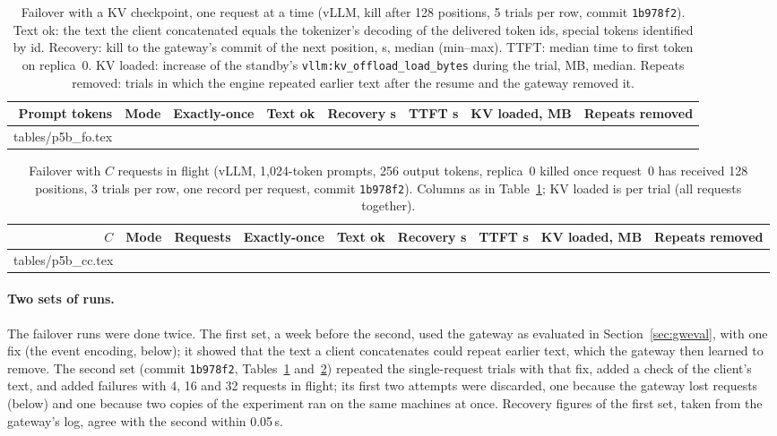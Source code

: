 \documentclass[10pt,twocolumn]{article}
\makeatletter
\def\PfbFoRows{\@@input tables/p5b_fo.tex }
\def\PccRows{\@@input tables/p5b_cc.tex }
\makeatother
\begin{document}
\begin{table}[t]
\centering\small
\caption{Failover with a KV checkpoint, one request at a time (vLLM, kill
after 128 positions, 5 trials per row, commit \texttt{1b978f2}). Text ok: the
text the client concatenated equals the tokenizer's decoding of the delivered
token ids, special tokens identified by id. Recovery: kill to the gateway's
commit of the next position, s, median (min--max). TTFT: median time to first
token on replica~0. KV loaded: increase of the standby's
\texttt{vllm:kv\_offload\_load\_bytes} during the trial, MB, median. Repeats
removed: trials in which the engine repeated earlier text after the resume
and the gateway removed it.}
\label{tab:pfbfo}
\begin{tabular}{@{}rlccrrrc@{}}
\toprule
Prompt tokens & Mode & Exactly-once & Text ok & Recovery s & TTFT s & KV loaded, MB & Repeats removed \\
\midrule
\PfbFoRows
\bottomrule
\end{tabular}
\end{table}

\begin{table}[t]
\centering\small
\caption{Failover with $C$ requests in flight (vLLM, 1{,}024-token prompts, 256
output tokens, replica~0 killed once request~0 has received 128 positions, 3
trials per row, one record per request, commit \texttt{1b978f2}). Columns as
in Table~\ref{tab:pfbfo}; KV loaded is per trial (all requests together).}
\label{tab:pfbcc}
\begin{tabular}{@{}rlrccrrrc@{}}
\toprule
$C$ & Mode & Requests & Exactly-once & Text ok & Recovery s & TTFT s & KV loaded, MB & Repeats removed \\
\midrule
\PccRows
\bottomrule
\end{tabular}
\end{table}

\paragraph{Two sets of runs.} The failover runs were done twice. The first set,
a week before the second, used the gateway as evaluated in
Section~\ref{sec:gweval}, with one fix (the event encoding, below); it showed
that the text a client concatenates could repeat earlier text, which the
gateway then learned to remove. The second set (commit \texttt{1b978f2},
Tables~\ref{tab:pfbfo} and~\ref{tab:pfbcc}) repeated the single-request
trials with that fix, added a check of the client's text, and added failures
with 4, 16 and 32 requests in flight; its first two attempts were discarded,
one because the gateway lost requests (below) and one because two copies of
the experiment ran on the same machines at once. Recovery figures of the
first set, taken from the gateway's log, agree with the second within
0.05\,s.
\end{document}
